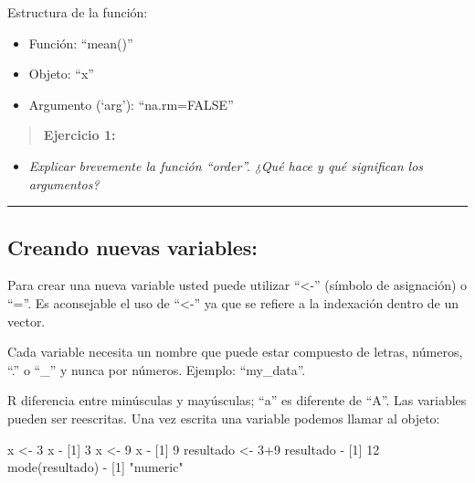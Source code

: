 \documentclass[
]{book}
\newenvironment{Shaded}{\begin{snugshade}}{\end{snugshade}}
\newcommand{\DecValTok}[1]{\textcolor[rgb]{0.00,0.00,0.81}{#1}}
\newcommand{\FunctionTok}[1]{\textcolor[rgb]{0.00,0.00,0.00}{#1}}
\newcommand{\NormalTok}[1]{#1}
\newcommand{\OtherTok}[1]{\textcolor[rgb]{0.56,0.35,0.01}{#1}}
\newcommand{\SpecialCharTok}[1]{\textcolor[rgb]{0.00,0.00,0.00}{#1}}
\newcommand{\StringTok}[1]{\textcolor[rgb]{0.31,0.60,0.02}{#1}}
\providecommand{\tightlist}{%
  \setlength{\itemsep}{0pt}\setlength{\parskip}{0pt}}
\begin{document}
Estructura de la función:

\begin{itemize}
\tightlist
\item
  Función: ``mean()''
\item
  Objeto: ``x''
\item
  Argumento (`arg'): ``na.rm=FALSE''
\end{itemize}

\begin{quote}
\textbf{Ejercicio 1:}
\end{quote}

\begin{itemize}
\tightlist
\item
  \emph{Explicar brevemente la función ``order''. ¿Qué hace y qué significan los argumentos?}
\end{itemize}

\begin{center}\rule{0.5\linewidth}{0.5pt}\end{center}

\hypertarget{creando-nuevas-variables}{%
\subsection{Creando nuevas variables:}\label{creando-nuevas-variables}}

Para crear una nueva variable usted puede utilizar ``\textless-'' (símbolo de asignación) o ``=''. Es aconsejable el uso de ``\textless-'' ya que se refiere a la indexación dentro de un vector.

Cada variable necesita un nombre que puede estar compuesto de letras, números, ``.'' o ``\_'' y nunca por números. Ejemplo: ``my\_data''.

R diferencia entre minúsculas y mayúsculas; ``a'' es diferente de ``A''. Las variables pueden ser reescritas. Una vez escrita una variable podemos llamar al objeto:

\begin{Shaded}
\begin{Highlighting}[]
\NormalTok{x }\OtherTok{\textless{}{-}} \DecValTok{3}
\NormalTok{x}
\SpecialCharTok{{-}}\NormalTok{ [}\DecValTok{1}\NormalTok{] }\DecValTok{3}
\NormalTok{x }\OtherTok{\textless{}{-}} \DecValTok{9}
\NormalTok{x}
\SpecialCharTok{{-}}\NormalTok{ [}\DecValTok{1}\NormalTok{] }\DecValTok{9}
\NormalTok{resultado }\OtherTok{\textless{}{-}} \DecValTok{3}\SpecialCharTok{+}\DecValTok{9}
\NormalTok{resultado}
\SpecialCharTok{{-}}\NormalTok{ [}\DecValTok{1}\NormalTok{] }\DecValTok{12}
\FunctionTok{mode}\NormalTok{(resultado)}
\SpecialCharTok{{-}}\NormalTok{ [}\DecValTok{1}\NormalTok{] }\StringTok{"numeric"}
\end{Highlighting}
\end{Shaded}
\end{document}
